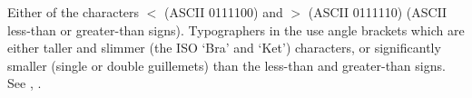  Either of the characters $<$ (ASCII 0111100) and $>$ (ASCII 0111110) (ASCII less-than or greater-than signs). Typographers
in the  use angle brackets which are either taller and slimmer (the ISO `Bra' and `Ket') characters, or significantly
smaller (single or double guillemets) than the less-than and greater-than signs. See , .

